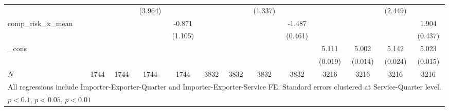 \begin{table}[htbp]
\begin{tabular}{l*{12}{c}}
            &                     &                     &     (3.964)         &                     &                     &                     &     (1.337)         &                     &                     &                     &     (2.449)         &                     \\
[1em]
comp\_risk\_x\_mean&                     &                     &                     &      -0.871         &                     &                     &                     &      -1.487\sym{***}&                     &                     &                     &       1.904\sym{***}\\
            &                     &                     &                     &     (1.105)         &                     &                     &                     &     (0.461)         &                     &                     &                     &     (0.437)         \\
[1em]
\_cons      &                     &                     &                     &                     &                     &                     &                     &                     &       5.111\sym{***}&       5.002\sym{***}&       5.142\sym{***}&       5.023\sym{***}\\
            &                     &                     &                     &                     &                     &                     &                     &                     &     (0.019)         &     (0.014)         &     (0.024)         &     (0.015)         \\
\hline
\(N\)       &        1744         &        1744         &        1744         &        1744         &        3832         &        3832         &        3832         &        3832         &        3216         &        3216         &        3216         &        3216         \\
\hline\hline
\multicolumn{13}{l}{\footnotesize All regressions include Importer-Exporter-Quarter and Importer-Exporter-Service FE. Standard errors clustered at Service-Quarter level.}\\
\multicolumn{13}{l}{\footnotesize \sym{*} \(p<0.1\), \sym{**} \(p<0.05\), \sym{***} \(p<0.01\)}\\
\end{tabular}
\end{table}
